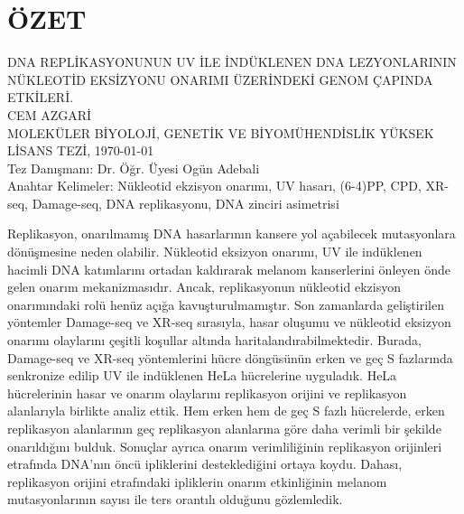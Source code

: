 \chapter*{\vspace{-4\baselineskip} \bf ÖZET} 
\begin{otherlanguage}{turkish}
\begin{center}
\MakeUppercase{DNA REPLİKASYONUNUN UV İLE İNDÜKLENEN DNA LEZYONLARININ NÜKLEOTİD EKSİZYONU ONARIMI ÜZERİNDEKİ GENOM ÇAPINDA ETKİLERİ.} \\[3\baselineskip]
\MakeUppercase{CEM AZGARİ} \\[\baselineskip]
MOLEKÜLER BİYOLOJİ, GENETİK VE BİYOMÜHENDİSLİK YÜKSEK LİSANS TEZİ, \Cemdateformat\today \\[\baselineskip]
Tez Danışmanı: Dr. Öğr. Üyesi Ogün Adebali \\[2\baselineskip]
Anahtar Kelimeler: Nükleotid ekzisyon onarımı, UV hasarı, (6-4)PP, CPD, XR-seq, Damage-seq, DNA replikasyonu, DNA zinciri asimetrisi \\[2\baselineskip]
\end{center}

\singlespacing
Replikasyon, onarılmamış DNA hasarlarının kansere yol açabilecek mutasyonlara dönüşmesine neden olabilir. Nükleotid eksizyon onarımı, UV ile indüklenen hacimli DNA katımlarını ortadan kaldırarak melanom kanserlerini önleyen önde gelen onarım mekanizmasıdır. Ancak, replikasyonun nükleotid ekzisyon onarımındaki rolü henüz açığa kavuşturulmamıştır. Son zamanlarda geliştirilen yöntemler Damage-seq ve XR-seq sırasıyla, hasar oluşumu ve nükleotid eksizyon onarımı olaylarını çeşitli koşullar altında haritalandırabilmektedir. Burada, Damage-seq ve XR-seq yöntemlerini hücre döngüsünün erken ve geç S fazlarında senkronize edilip UV ile indüklenen HeLa hücrelerine uyguladık. HeLa hücrelerinin hasar ve onarım olaylarını replikasyon orijini ve replikasyon alanlarıyla birlikte analiz ettik. Hem erken hem de geç S fazlı hücrelerde, erken replikasyon alanlarının geç replikasyon alanlarına göre daha verimli bir şekilde onarıldığını bulduk. Sonuçlar ayrıca onarım verimliliğinin replikasyon orijinleri etrafında DNA'nın öncü ipliklerini desteklediğini ortaya koydu. Dahası, replikasyon orijini etrafındaki ipliklerin onarım etkinliğinin melanom mutasyonlarının sayısı ile ters orantılı olduğunu gözlemledik.

\end{otherlanguage}

\clearpage\pagebreak
\onehalfspacing